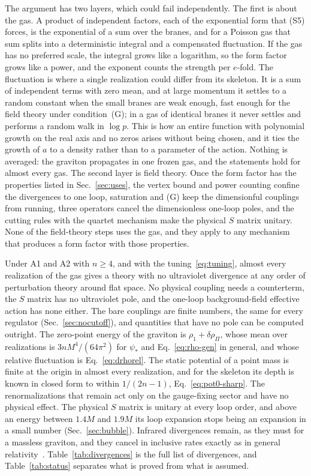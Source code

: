 \documentclass[aps,prd,10pt,twocolumn,superscriptaddress,nofootinbib,floatfix,longbibliography]{revtex4-2}
\begin{document}
The argument has two layers, which could fail independently. The first is about the gas. A product of independent factors, each of the exponential form that (S5) forces, is the exponential of a sum over the branes, and for a Poisson gas that sum splits into a deterministic integral and a compensated fluctuation. If the gas has no preferred scale, the integral grows like a logarithm, so the form factor grows like a power, and the exponent counts the strength per $e$-fold. The fluctuation is where a single realization could differ from its skeleton. It is a sum of independent terms with zero mean, and at large momentum it settles to a random constant when the small branes are weak enough, fast enough for the field theory under condition~(G); in a gas of identical branes it never settles and performs a random walk in $\log p$. This is how an entire function with polynomial growth on the real axis and no zeros arises without being chosen, and it ties the growth of $a$ to a density rather than to a parameter of the action. Nothing is averaged: the graviton propagates in one frozen gas, and the statements hold for almost every gas. The second layer is field theory. Once the form factor has the properties listed in Sec.~\ref{sec:uses}, the vertex bound and power counting confine the divergences to one loop, saturation and (G) keep the dimensionful couplings from running, three operators cancel the dimensionless one-loop poles, and the cutting rules with the quartet mechanism make the physical $S$ matrix unitary. None of the field-theory steps uses the gas, and they apply to any mechanism that produces a form factor with those properties.

Under A1 and A2 with $n\ge4$, and with the tuning~\eqref{eq:tuning}, almost every realization of the gas gives a theory with no ultraviolet divergence at any order of perturbation theory around flat space. No physical coupling needs a counterterm, the $S$ matrix has no ultraviolet pole, and the one-loop background-field effective action has none either. The bare couplings are finite numbers, the same for every regulator (Sec.~\ref{sec:nocutoff}), and quantities that have no pole can be computed outright. The zero-point energy of the graviton is $\rho_1+\delta\rho_\Pi$, whose mean over realizations is $3nM^4/(64\pi^2)$ for $\psi_*$ and Eq.~\eqref{eq:rho-gen} in general, and whose relative fluctuation is Eq.~\eqref{eq:drhorel}. The static potential of a point mass is finite at the origin in almost every realization, and for the skeleton its depth is known in closed form to within $1/(2n-1)$, Eq.~\eqref{eq:pot0-sharp}. The renormalizations that remain act only on the gauge-fixing sector and have no physical effect. The physical $S$ matrix is unitary at every loop order, and above an energy between $1.4M$ and $1.9M$ its loop expansion stops being an expansion in a small number (Sec.~\ref{sec:bubble}). Infrared divergences remain, as they must for a massless graviton, and they cancel in inclusive rates exactly as in general relativity~\cite{Weinberg1965}. Table~\ref{tab:divergences} is the full list of divergences, and Table~\ref{tab:status} separates what is proved from what is assumed.
\end{document}
